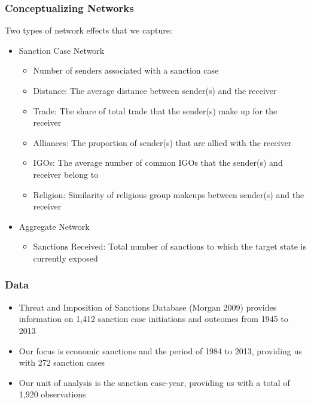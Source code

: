 \begin{frame}
\frametitle{Conceptualizing Networks}

Two types of network effects that we capture:

\begin{itemize}
	\item Sanction Case Network
	\begin{itemize}
		\item Number of senders associated with a sanction case
		\item Distance: The average distance between sender(s) and the receiver
		\item Trade: The share of total trade that the sender(s) make up for the receiver		
		\item Alliances: The proportion of sender(s) that are allied with the receiver
		\item IGOs: The average number of common IGOs that the sender(s) and receiver belong to
		\item Religion: Similarity of religious group makeups between sender(s) and the receiver
	\end{itemize}
	\item Aggregate Network
	\begin{itemize}
		\item Sanctions Received: Total number of sanctions to which the target state is currently exposed
	\end{itemize}
\end{itemize}

\end{frame}

\begin{frame}
\frametitle{Data}

\begin{itemize}
	\item Threat and Imposition of Sanctions Database (Morgan 2009) provides information on 1,412 sanction case initiations and outcomes from 1945 to 2013
		\vspace{0.1cm}
	\item Our focus is economic sanctions and the period of 1984 to 2013, providing us with 272 sanction cases \\
		\vspace{0.1cm}
	\item Our unit of analysis is the sanction case-year, providing us with a total of 1,920 observations
\end{itemize}

\end{frame}


